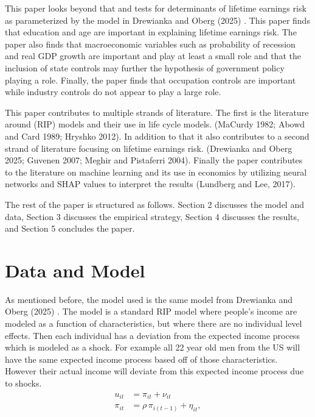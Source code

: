 \documentclass[12pt]{article}
\begin{document}
\begin{onehalfspace}
This paper looks beyond that and tests for determinants of lifetime earnings risk as parameterized by the model in Drewianka and Oberg (2025) \cite{drewianka2025}. This paper finds that education and age are important in explaining lifetime earnings risk. The paper also finds that macroeconomic variables such as probability of recession and real GDP growth are important and play at least a small role and that the inclusion of state controls may further the hypothesis of government policy playing a role. Finally, the paper finds that occupation controls are important while industry controls do not appear to play a large role.



This paper contributes to multiple strands of literature. The first is the literature around (RIP) models and their use in life cycle models. (MaCurdy 1982; Abowd and Card 1989; Hryshko 2012). \cite{macurdy1982, abowd_card1989, hryshko2012} In addition to that it also contributes to a second strand of literature focusing on lifetime earnings risk. (Drewianka and Oberg 2025; Guvenen 2007; Meghir and Pistaferri 2004). \cite{drewianka2025,guvenen2007,meghir_pistaferri2004} Finally the paper contributes to the literature on machine learning and its use in economics by utilizing neural networks and SHAP values to interpret the results (Lundberg and Lee, 2017). \cite{lundberq} 

The rest of the paper is structured as follows. Section 2 discusses the model and data, Section 3 discusses the empirical strategy, Section 4 discusses the results, and Section 5 concludes the paper. 

\section{Data and Model}

As mentioned before, the model used is the same model from Drewianka and Oberg (2025) \cite{drewianka2025}. The model is a standard RIP model where people's income are modeled as a function of characteristics, but where there are no individual level effects. Then each individual has a deviation from the expected income process which is modeled as a shock. For example all 22 year old men from the US will have the same expected income process based off of those characteristics. However their actual income will deviate from this expected income process due to shocks. 
\vspace{-0.75cm} %
\begin{align}
u_{it} 
&= \pi_{it} + \nu_{it} \\[1ex]
\pi_{it} 
&= \rho\,\pi_{i(t-1)} + \eta_{it},
\end{align}


\end{onehalfspace}
\end{document}
